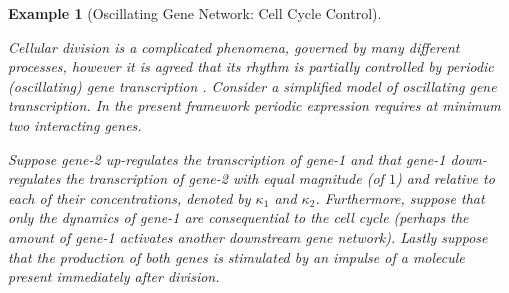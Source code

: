 \documentclass[9 pt]{article}
\newcommand{\1}{\mathbbm{1}}
\newtheorem{example}{Example}
\begin{document}
  \begin{example}[Oscillating Gene Network: Cell Cycle Control]\label{ex:oscillator}


    Cellular division is a complicated phenomena, governed by many different processes, however it is agreed that its rhythm is partially controlled by periodic (oscillating) gene transcription \citep{orlando2008global}. Consider a simplified model of oscillating gene transcription. In the present framework periodic expression requires at minimum two interacting genes. 

    Suppose gene-2 up-regulates the transcription of gene-1 and that gene-1 down-regulates the transcription of gene-2 with equal magnitude (of $1$) and relative to each of their concentrations, denoted by $\kappa_{1}$ and $\kappa_{2}$. Furthermore, suppose that only the dynamics of gene-1 are consequential to the cell cycle (perhaps the amount of gene-1 activates another downstream gene network). Lastly suppose that the production of both genes is stimulated by an impulse of a molecule present immediately after division.


\end{example}
\end{document}
